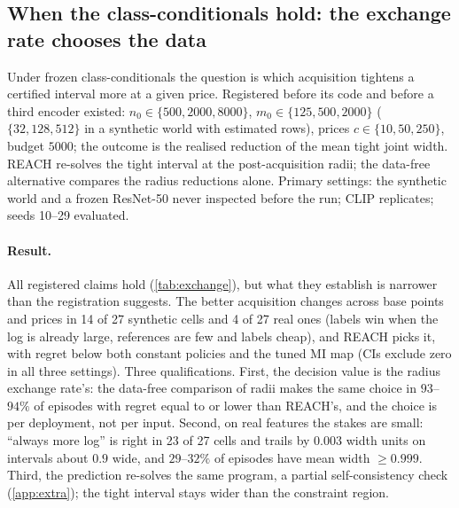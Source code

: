 \subsection{When the class-conditionals hold: the exchange rate chooses the data}
\label{sec:exp-exchange}

Under frozen class-conditionals the question is which acquisition tightens a certified interval more at
a given price. Registered before its code and before a third encoder existed: $n_0\in\{500,2000,8000\}$,
$m_0\in\{125,500,2000\}$ ($\{32,128,512\}$ in a synthetic world with estimated rows), prices
$c\in\{10,50,250\}$, budget $5000$; the outcome is the realised reduction of the mean tight joint width.
REACH re-solves the tight interval at the post-acquisition radii; the data-free alternative compares the
radius reductions alone. Primary settings: the synthetic world and a frozen ResNet-50 \citep{he2016deep}
never inspected before the run; CLIP replicates; seeds 10--29 evaluated.

\begin{table}[t]
\centering\small
\caption{Exchange-rate test under pure label shift: which acquisition tightens the certified interval
more. Regret in width units, evaluation seeds; CI: seed bootstrap.}
\label{tab:exchange}
\setlength{\tabcolsep}{3pt}
\resizebox{\columnwidth}{!}{}
\end{table}

\paragraph{Result.} All registered claims hold (\cref{tab:exchange}), but what they establish is
narrower than the registration suggests. The better acquisition changes across base points and prices
in 14 of 27 synthetic cells and 4 of 27 real ones (labels win when the log is already large, references are
few and labels cheap), and REACH picks it, with regret below both constant policies and the tuned MI map
(CIs exclude zero in all three settings). Three qualifications. First, the decision value is the radius
exchange rate's: the data-free comparison of radii makes the same choice in $93$--$94\%$ of episodes with
regret equal to or lower than REACH's, and the choice is per deployment, not per input. Second, on real
features the stakes are small: ``always more log'' is right in 23 of 27 cells and trails by $0.003$ width
units on intervals about $0.9$ wide, and $29$--$32\%$ of episodes have mean width $\ge0.999$. Third, the
prediction re-solves the same program, a partial self-consistency check (\cref{app:extra}); the tight
interval stays wider than the constraint region.

